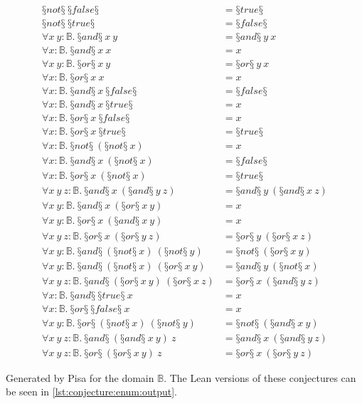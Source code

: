 \begin{conjectureset}[H]
\begin{align}
§not§\ §false§ &= §true§ \\
§not§\ §true§ &= §false§ \\
\forall x\ y : \mathbb{B}.\ §and§\ x\ y &= §and§\ y\ x \label{andcom}\\
\forall x : \mathbb{B}.\ §and§\ x\ x &= x \\
\forall x\ y : \mathbb{B}.\ §or§\ x\ y &= §or§\ y\ x \label{orcom}\\
\forall x : \mathbb{B}.\ §or§\ x\ x &= x \\
\forall x : \mathbb{B}.\ §and§\ x\ §false§ &= §false§ \\
\forall x : \mathbb{B}.\ §and§\ x\ §true§ &= x \\
\forall x : \mathbb{B}.\ §or§\ x\ §false§ &= x \\
\forall x : \mathbb{B}.\ §or§\ x\ §true§ &= §true§ \\
\forall x : \mathbb{B}.\ §not§\ (§not§\ x) &= x \label{notinverse}\\
\forall x : \mathbb{B}.\ §and§\ x\ (§not§\ x) &= §false§ \\
\forall x : \mathbb{B}.\ §or§\ x\ (§not§\ x) &= §true§ \\
\forall x\ y\ z : \mathbb{B}.\ §and§\ x\ (§and§\ y\ z) &= §and§\ y\ (§and§\ x\ z) \\
\forall x\ y : \mathbb{B}.\ §and§\ x\ (§or§\ x\ y) &= x \\
\forall x\ y : \mathbb{B}.\ §or§\ x\ (§and§\ x\ y) &= x \\
\forall x\ y\ z : \mathbb{B}.\ §or§\ x\ (§or§\ y\ z) &= §or§\ y\ (§or§\ x\ z) \\
\forall x\ y : \mathbb{B}.\ §and§\ (§not§\ x)\ (§not§\ y) &= §not§\ (§or§\ x\ y) \label{demorgan1}\\
\forall x\ y : \mathbb{B}.\ §and§\ (§not§\ x)\ (§or§\ x\ y) &= §and§\ y\ (§not§\ x) \\
\forall x\ y\ z : \mathbb{B}.\ §and§\ (§or§\ x\ y)\ (§or§\ x\ z) &= §or§\ x\ (§and§\ y\ z) \\
\forall x : \mathbb{B}.\ §and§\ §true§\ x &= x \\
\forall x : \mathbb{B}.\ §or§\ §false§\ x &= x \\
\forall x\ y : \mathbb{B}.\ §or§\ (§not§\ x)\ (§not§\ y) &= §not§\ (§and§\ x\ y) \label{demorgan2}\\
\forall x\ y\ z : \mathbb{B}.\ §and§\ (§and§\ x\ y)\ z &= §and§\ x\ (§and§\ y\ z) \label{andassoc}\\
\forall x\ y\ z : \mathbb{B}.\ §or§\ (§or§\ x\ y)\ z &= §or§\ x\ (§or§\ y\ z) \label{orassoc}
\end{align}
\vspace{-0.9cm}
\caption[Generated by Pisa for the domain $\mathbb{B}$.]{
  Generated by Pisa for the domain $\mathbb{B}$.
  The Lean versions of these conjectures can be seen in \cref{lst:conjecture:enum:output}.
}\label{eqs:enum}
\end{conjectureset}

